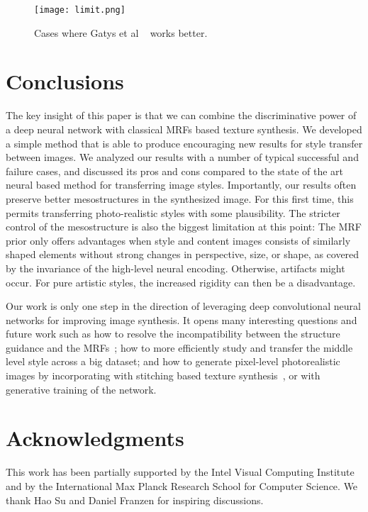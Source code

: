 \documentclass[10pt,twocolumn,letterpaper]{article}
\begin{document}
\begin{figure}[t]
	\centering
	\texttt{[image: limit.png]}
	\caption{Cases where Gatys et al ~\cite{Gatys15} works better.}\label{fig:limit}
\end{figure}

\section{Conclusions}
The key insight of this paper is that we can combine the discriminative power of a deep neural network with classical MRFs based texture synthesis. We developed a simple method that is able to produce encouraging new results for style transfer between images. We analyzed our results with a number of typical successful and failure cases, and discussed its pros and cons compared to the state of the art neural based method for transferring image styles. Importantly, our results often preserve better mesostructures in the synthesized image. For this first time, this permits transferring photo-realistic styles with some plausibility. The stricter control of the mesostructure is also the biggest limitation at this point: The MRF prior only offers advantages when style and content images consists of similarly shaped elements without strong changes in perspective, size, or shape, as covered by the invariance of the high-level neural encoding. Otherwise, artifacts might occur. For pure artistic styles, the increased rigidity can then be a disadvantage.

Our work is only one step in the direction of leveraging deep convolutional neural networks for improving image synthesis. It opens many interesting questions and future work such as how to resolve the incompatibility between the structure guidance and the MRFs~\cite{He12}; how to more efficiently study and transfer the middle level style across a big dataset; and how to generate pixel-level photorealistic images by incorporating with stitching based texture synthesis~\cite{Kwatra03}, or with generative training of the network.


\section*{Acknowledgments}
This work has been partially supported by the Intel Visual Computing Institute and by the International Max Planck Research School for Computer Science. We thank Hao Su and Daniel Franzen for inspiring discussions.

{\small


}
\end{document}
